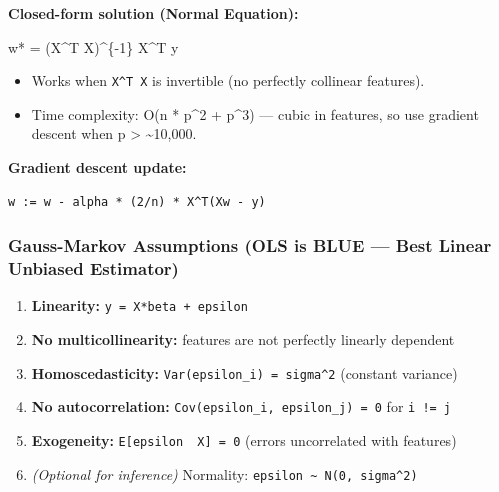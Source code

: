\documentclass[11pt]{article}
\providecommand{\tightlist}{\setlength{\itemsep}{1pt}\setlength{\parskip}{0pt}}
\newenvironment{Shaded}{\begin{snugshade}}{\end{snugshade}}
\newcommand{\DecValTok}[1]{\textcolor[rgb]{0.96,0.45,0.00}{#1}}
\newcommand{\NormalTok}[1]{\textcolor[rgb]{0.81,0.81,0.76}{#1}}
\newcommand{\OperatorTok}[1]{\textcolor[rgb]{0.81,0.81,0.76}{#1}}
\begin{document}
\textbf{Closed-form solution (Normal Equation):}


\begin{Shaded}
\begin{Highlighting}[]
\NormalTok{w}\OperatorTok{*} \OperatorTok{=}\NormalTok{ (X}\OperatorTok{\^{}}\NormalTok{T X)}\OperatorTok{\^{}}\NormalTok{\{}\OperatorTok{{-}}\DecValTok{1}\NormalTok{\} X}\OperatorTok{\^{}}\NormalTok{T y}
\end{Highlighting}
\end{Shaded}

\begin{itemize}
\tightlist
\item
  Works when \texttt{X\^{}T\ X} is invertible (no perfectly collinear features).
\item
  Time complexity: O(n * p\^{}2 + p\^{}3) --- cubic in features, so use gradient descent when p \textgreater{} \textasciitilde10,000.
\end{itemize}

\textbf{Gradient descent update:}

\setcodelang{}

\begin{verbatim}
w := w - alpha * (2/n) * X^T(Xw - y)
\end{verbatim}

\subsubsection{Gauss-Markov Assumptions (OLS is BLUE --- Best Linear Unbiased Estimator)}\label{gauss-markov-assumptions-ols-is-blue--best-linear-unbiased-estimator}

\begin{enumerate}
\def\labelenumi{\arabic{enumi}.}
\tightlist
\item
  \textbf{Linearity:} \texttt{y\ =\ X*beta\ +\ epsilon}
\item
  \textbf{No multicollinearity:} features are not perfectly linearly dependent
\item
  \textbf{Homoscedasticity:} \texttt{Var(epsilon\_i)\ =\ sigma\^{}2} (constant variance)
\item
  \textbf{No autocorrelation:} \texttt{Cov(epsilon\_i,\ epsilon\_j)\ =\ 0} for \texttt{i\ !=\ j}
\item
  \textbf{Exogeneity:} \texttt{E{[}epsilon\ \textbar{}\ X{]}\ =\ 0} (errors uncorrelated with features)
\item
  \emph{(Optional for inference)} Normality: \texttt{epsilon\ \textasciitilde{}\ N(0,\ sigma\^{}2)}
\end{enumerate}
\end{document}
